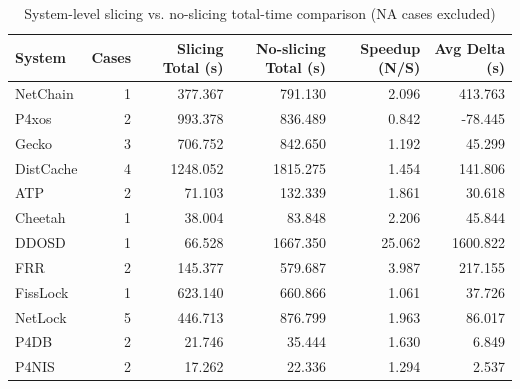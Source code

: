 \begin{table}[htbp]
\centering
\caption{System-level slicing vs. no-slicing total-time comparison (NA cases excluded)}
\begin{tabular}{lrrrrr}
\toprule
System & Cases & Slicing Total (s) & No-slicing Total (s) & Speedup (N/S) & Avg Delta (s) \\
\midrule
NetChain & 1 & 377.367 & 791.130 & 2.096 & 413.763 \\
P4xos & 2 & 993.378 & 836.489 & 0.842 & -78.445 \\
Gecko & 3 & 706.752 & 842.650 & 1.192 & 45.299 \\
DistCache & 4 & 1248.052 & 1815.275 & 1.454 & 141.806 \\
ATP & 2 & 71.103 & 132.339 & 1.861 & 30.618 \\
Cheetah & 1 & 38.004 & 83.848 & 2.206 & 45.844 \\
DDOSD & 1 & 66.528 & 1667.350 & 25.062 & 1600.822 \\
FRR & 2 & 145.377 & 579.687 & 3.987 & 217.155 \\
FissLock & 1 & 623.140 & 660.866 & 1.061 & 37.726 \\
NetLock & 5 & 446.713 & 876.799 & 1.963 & 86.017 \\
P4DB & 2 & 21.746 & 35.444 & 1.630 & 6.849 \\
P4NIS & 2 & 17.262 & 22.336 & 1.294 & 2.537 \\
\bottomrule
\end{tabular}
\end{table}

